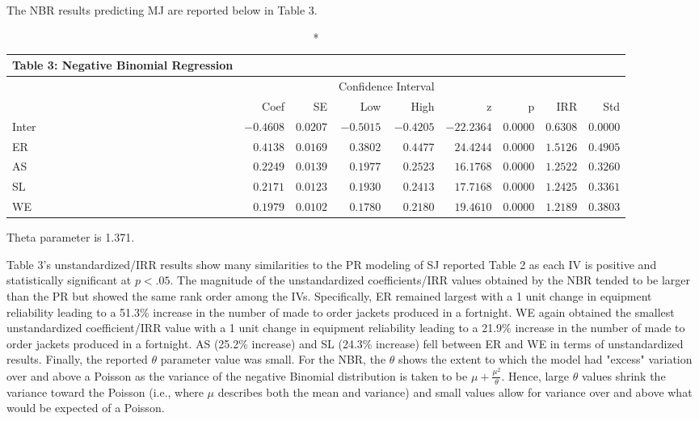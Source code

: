 \documentclass[ShortAfour,times,sageapa]{sagej}
\begin{document}
	The NBR results predicting MJ are reported below in Table 3.
	
	\setlength{\LTpost}{1mm}
	\begin{longtable}{l|rrrrrrrr}
		\caption*{
			{\large Table 3: Negative Binomial Regression}
		} \\ 
		\toprule
		\multicolumn{1}{l}{} &  &  & \multicolumn{2}{c}{Confidence Interval} &  &  &  &  \\ 
		\cmidrule(lr){4-5}
		\multicolumn{1}{l}{} & Coef & SE & Low & High & z & p & IRR & Std \\ 
		\midrule
		Inter & $-0.4608$ & $0.0207$ & $-0.5015$ & $-0.4205$ & $-22.2364$ & $0.0000$ & $0.6308$ & $0.0000$ \\ 
		ER & $0.4138$ & $0.0169$ & $0.3802$ & $0.4477$ & $24.4244$ & $0.0000$ & $1.5126$ & $0.4905$ \\ 
		AS & $0.2249$ & $0.0139$ & $0.1977$ & $0.2523$ & $16.1768$ & $0.0000$ & $1.2522$ & $0.3260$ \\ 
		SL & $0.2171$ & $0.0123$ & $0.1930$ & $0.2413$ & $17.7168$ & $0.0000$ & $1.2425$ & $0.3361$ \\ 
		WE & $0.1979$ & $0.0102$ & $0.1780$ & $0.2180$ & $19.4610$ & $0.0000$ & $1.2189$ & $0.3803$ \\ 
		\bottomrule
	\end{longtable}
	\begin{minipage}{\linewidth}
		Theta parameter is 1.371.\\
	\end{minipage}

	Table 3's unstandardized/IRR results show many similarities to the PR modeling of SJ reported Table 2 as each IV is positive and statistically significant at $p < .05$. 
	The magnitude of the unstandardized coefficients/IRR values obtained by the NBR tended to be larger than the PR but showed the same rank order among the IVs.
	Specifically, ER remained largest with a 1 unit change in equipment reliability leading to a 51.3\% increase in the number of made to order jackets produced in a fortnight.
	WE again obtained the smallest unstandardized coefficient/IRR value with a 1 unit change in equipment reliability leading to a 21.9\% increase in the number of made to order jackets produced in a fortnight. 
	AS (25.2\% increase) and SL (24.3\% increase) fell between ER and WE in terms of unstandardized results.
	Finally, the reported $\theta$ parameter value was small. 
	For the NBR, the $\theta$ shows the extent to which the model had "excess" variation over and above a Poisson as the variance of the negative Binomial distribution is taken to be $\mu + \frac{\mu^2}{\theta}$. 
	Hence, large $\theta$ values shrink the variance toward the Poisson (i.e., where $\mu$ describes both the mean and variance) and small values allow for variance over and above what would be expected of a Poisson.
	
\end{document}
